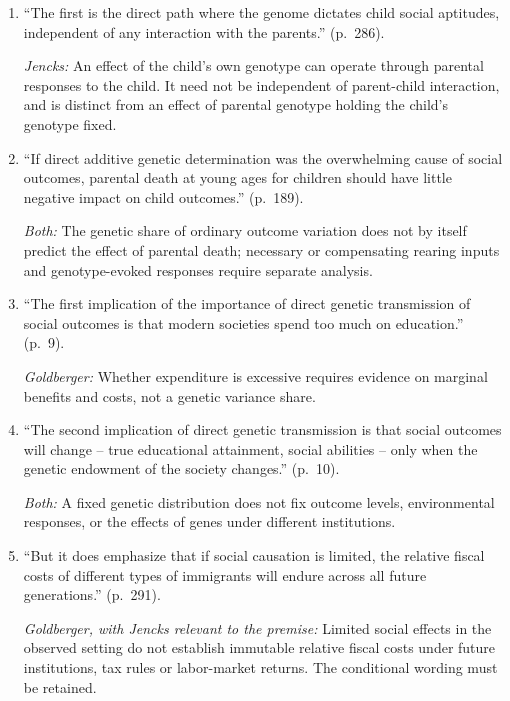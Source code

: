 \begin{enumerate}[label=\arabic*.]
\emph{Both:} A small shared-environment component does not establish weak causal effects of named institutions or parenting; their effects may be genetically mediated or their observed variation limited.

\item ``The first is the direct path where the genome dictates child social aptitudes, independent of any interaction with the parents.'' (p.~286).

\emph{Jencks:} An effect of the child's own genotype can operate through parental responses to the child. It need not be independent of parent-child interaction, and is distinct from an effect of parental genotype holding the child's genotype fixed.

\item ``If direct additive genetic determination was the overwhelming cause of social outcomes, parental death at young ages for children should have little negative impact on child outcomes.'' (p.~189).

\emph{Both:} The genetic share of ordinary outcome variation does not by itself predict the effect of parental death; necessary or compensating rearing inputs and genotype-evoked responses require separate analysis.

\item ``The first implication of the importance of direct genetic transmission of social outcomes is that modern societies spend too much on education.'' (p.~9).

\emph{Goldberger:} Whether expenditure is excessive requires evidence on marginal benefits and costs, not a genetic variance share.

\item ``The second implication of direct genetic transmission is that social outcomes will change -- true educational attainment, social abilities -- only when the genetic endowment of the society changes.'' (p.~10).

\emph{Both:} A fixed genetic distribution does not fix outcome levels, environmental responses, or the effects of genes under different institutions.

\item ``But it does emphasize that if social causation is limited, the relative fiscal costs of different types of immigrants will endure across all future generations.'' (p.~291).

\emph{Goldberger, with Jencks relevant to the premise:} Limited social effects in the observed setting do not establish immutable relative fiscal costs under future institutions, tax rules or labor-market returns. The conditional wording must be retained.

\end{enumerate}

